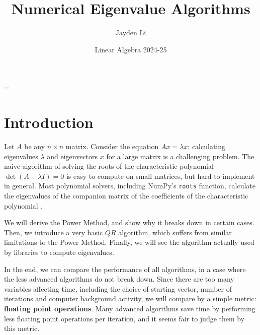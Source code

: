\documentclass{article}
\title{\vspace*{-40pt}Numerical Eigenvalue Algorithms}
\author{Jayden Li}
\date{Linear Algebra 2024-25}
\begin{document}
\fontsize{11pt}{12pt}\selectfont
\setlength{\abovedisplayskip}{\abovedisplayskip/2}
\setlength{\belowdisplayskip}{\belowdisplayskip/2}
\setlength{\parindent}{0pt}
\setlength{\parskip}{2ex plus 0.5ex minus 0.2ex}
\maketitle

\def\mathdefault#1{#1}
\everymath=\expandafter{\the\everymath\displaystyle}

\section{Introduction}

Let $A$ be any $n\times n$ matrix. Consider the equation $Ax=\lambda x$: calculating eigenvalues $\lambda$ and eigenvectors $x$ for a large matrix is a challenging problem. The naive algorithm of solving the roots of the characteristic polynomial $\det(A-\lambda I)=0$ is easy to compute on small matrices, but hard to implement in general. Most polynomial solvers, including NumPy's \texttt{roots} function, calculate the eigenvalues of the companion matrix of the coefficients of the characteristic polynomial \cite{nproots}.

We will derive the Power Method, and show why it breaks down in certain cases. Then, we introduce a very basic $QR$ algorithm, which suffers from similar limitations to the Power Method. Finally, we will see the algorithm actually used by libraries to compute eigenvalues.

In the end, we can compare the performance of all algorithms, in a case where the less advanced algorithms do not break down. Since there are too many variables affecting time, including the choice of starting vector, number of iterations and computer background activity, we will compare by a simple metric: \textbf{floating point operations}. Many advanced algorithms save time by performing less floating point operations per iteration, and it seems fair to judge them by this metric.

\end{document}
